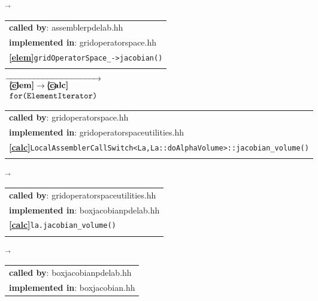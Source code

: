 \begin{landscape}
{\begin{tabular}{|l|}
  \end{tabular}
    $\overrightarrow{
    }$
       \begin{tabular}{|l|}
      \hline
      \textbf{called by}: assemblerpdelab.hh\\
      \textbf{implemented in}: gridoperatorspace.hh\\  
      \textbf{\textcircled{\ref{elem}}}\verb+gridOperatorSpace_->jacobian()+ \\
    \begin{scriptsize}\end{scriptsize}\\\hline
  \end{tabular}
    \nextline
    {\scriptsize$\overrightarrow{\begin{array}{l}
				  \textbf{\textcircled{\ref{elem}}}\rightarrow\textbf{\textcircled{\ref{calc}}}\\
				  \texttt{for(ElementIterator)}
                                \end{array}
    }$}
     \begin{tabular}{|l|}
      \hline
      \textbf{called by}: gridoperatorspace.hh\\
      \textbf{implemented in}: gridoperatorspaceutilities.hh\\  
      \textbf{\textcircled{\ref{calc}}}\verb+LocalAssemblerCallSwitch<La,La::doAlphaVolume>::jacobian_volume()+ \\
    \begin{scriptsize}\end{scriptsize}\\\hline
  \end{tabular}
\nextline
    $\overrightarrow{
    }$
     \begin{tabular}{|l|}
      \hline
      \textbf{called by}: gridoperatorspaceutilities.hh\\
      \textbf{implemented in}:  boxjacobianpdelab.hh\\  
      \textbf{\textcircled{\ref{calc}}}\verb+la.jacobian_volume()+ \\
    \begin{scriptsize}\end{scriptsize}\\\hline
  \end{tabular}
    $\overrightarrow{
    }$
    \begin{tabular}{|l|}
      \hline
      \textbf{called by}: boxjacobianpdelab.hh\\
      \textbf{implemented in}: boxjacobian.hh\\  

\end{tabular}}
\end{landscape}
